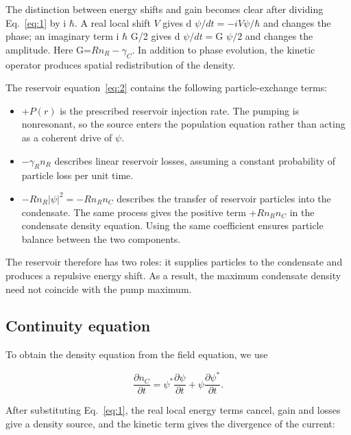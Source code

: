 \documentclass[12pt,a4paper]{article}
\begin{document}
The distinction between energy shifts and gain becomes clear after dividing Eq.~\eqref{eq:1} by i $\hbar$. A real local shift $V$ gives d $\psi/dt=-i V \psi/\hbar$ and changes the phase; an imaginary term i $\hbar$ G/2 gives d $\psi/dt=$G $\psi/2$ and changes the amplitude. Here G=$R n_{R}-\gamma_{C}$. In addition to phase evolution, the kinetic operator produces spatial redistribution of the density.

The reservoir equation~\eqref{eq:2} contains the following particle-exchange terms:

\begin{itemize}\setlength{\itemsep}{3pt}\item +$P(r)$ is the prescribed reservoir injection rate. The pumping is nonresonant, so the source enters the population equation rather than acting as a coherent drive of $\psi$.\end{itemize}

\begin{itemize}\setlength{\itemsep}{3pt}\item $-\gamma_{R} n_{R}$ describes linear reservoir losses, assuming a constant probability of particle loss per unit time.\end{itemize}

\begin{itemize}\setlength{\itemsep}{3pt}\item $-R n_{R}|\psi|^2=-R n_{R} n_{C}$ describes the transfer of reservoir particles into the condensate. The same process gives the positive term +$R n_{R} n_{C}$ in the condensate density equation. Using the same coefficient ensures particle balance between the two components.\end{itemize}

The reservoir therefore has two roles: it supplies particles to the condensate and produces a repulsive energy shift. As a result, the maximum condensate density need not coincide with the pump maximum.

\subsection{Continuity equation}\label{sec:2.3}

To obtain the density equation from the field equation, we use

\[
\frac{\partial n_C}{\partial t}=\psi^*\frac{\partial\psi}{\partial t}+\psi\frac{\partial\psi^*}{\partial t}.
\]

After substituting Eq.~\eqref{eq:1}, the real local energy terms cancel, gain and losses give a density source, and the kinetic term gives the divergence of the current:
\end{document}

